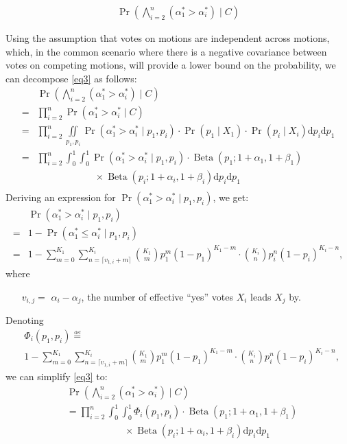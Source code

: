 \documentclass{sigchi}
\begin{document}
\begin{align}\label{eq3}
\Pr\left(\bigwedge_{i=2}^n (\alpha^*_1 > \alpha^*_i) \mid C\right)
\end{align}

Using the assumption
that votes on motions are independent across motions, which, in the common
scenario where there is a negative covariance between votes on competing
motions, will provide a lower bound on the probability, we can decompose \eqref{eq3} as follows:
\begin{align*}
& \Pr\left(\bigwedge_{i=2}^n (\alpha^*_1 > \alpha^*_i) \mid C\right)\\
=& \prod_{i=2}^n \Pr(\alpha^*_1 > \alpha^*_i \mid C)\\
=& \prod_{i=2}^n \iint\limits_{p_1, p_i} \Pr(\alpha^*_1 > \alpha^*_i \mid p_1, p_i) \cdot \Pr(p_1 \mid X_1) \cdot \Pr(p_i \mid X_i) \mathrm{d}p_i \mathrm{d}p_1\\
=& \prod_{i=2}^n \int_0^1 \int_0^1 \Pr(\alpha^*_1 > \alpha^*_i \mid p_1, p_i) \cdot \operatorname{Beta}(p_1; 1+\alpha_1,1+\beta_1) \\
& \qquad\qquad\qquad \times \operatorname{Beta}(p_i; 1+\alpha_i,1+\beta_i) \mathrm{d}p_i \mathrm{d}p_1\\
\end{align*}
Deriving an expression for $\Pr(\alpha^*_1 > \alpha^*_i \mid p_1, p_i)$, we get:
\begin{align*}
& \Pr(\alpha^*_1 > \alpha^*_i \mid p_1, p_i)\\
=& 1 - \Pr(\alpha^*_1 \leq \alpha^*_i \mid p_1, p_i)\\
=& 1 - \sum\limits_{m=0}^{K_1} \sum\limits_{n=\lceil{v_{1,i}+m}\rceil}^{K_i} {K_1 \choose m} p_1^{m} {(1-p_1)}^{K_1 - m} \cdot {K_i \choose n} p_i^{n} {(1-p_i)}^{K_i-n},
\end{align*}
where
\begin{description}
\begin{itemize}
\item[$v_{i,j} = $] $\alpha_i - \alpha_j$, the number of effective ``yes'' votes $X_i$ leads $X_j$ by.
\end{itemize}
\end{description}

Denoting
\begin{align}\label{eq4}
& \Phi_i(p_1,p_i) {\overset {\underset {\mathrm {def} }{}}{=}} \nonumber\\
& 1 - \sum\limits_{m=0}^{K_1} \sum\limits_{n=\lceil{v_{1,i}+m}\rceil}^{K_i} {K_1 \choose m} p_1^{m} {(1-p_1)}^{K_1 - m} \cdot {K_i \choose n} p_i^{n} {(1-p_i)}^{K_i-n},
\end{align}
we can simplify \eqref{eq3} to:
\begin{align}\label{eq5}
& \Pr\left(\bigwedge_{i=2}^n (\alpha^*_1 > \alpha^*_i) \mid C\right)\nonumber\\
&= \prod_{i=2}^n \int_0^1 \int_0^1 \Phi_i(p_1,p_i) \cdot \operatorname{Beta}(p_1; 1+\alpha_1,1+\beta_1) \nonumber\\
& \qquad\qquad\qquad \times \operatorname{Beta}(p_i; 1+\alpha_i,1+\beta_i) \mathrm{d}p_i \mathrm{d}p_1
\end{align}
\end{document}
